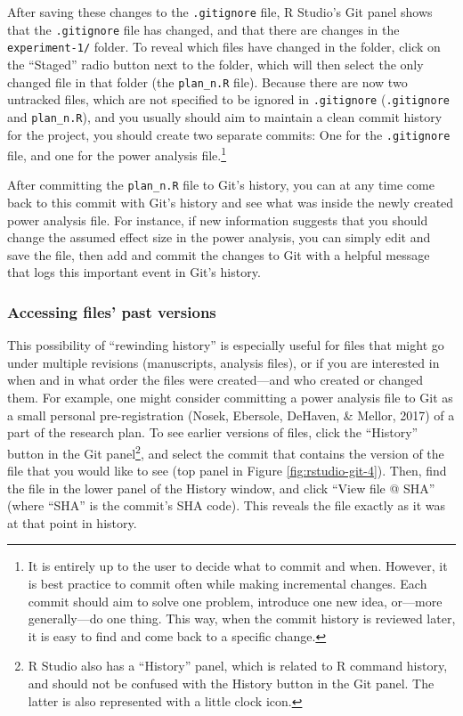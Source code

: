 \documentclass[
  american,
  ,doc,floatsintext]{apa6}
\begin{document}
After saving these changes to the \texttt{.gitignore} file, R Studio's Git panel shows that the \texttt{.gitignore} file has changed, and that there are changes in the \texttt{experiment-1/} folder. To reveal which files have changed in the folder, click on the ``Staged'' radio button next to the folder, which will then select the only changed file in that folder (the \texttt{plan\_n.R} file). Because there are now two untracked files, which are not specified to be ignored in \texttt{.gitignore} (\texttt{.gitignore} and \texttt{plan\_n.R}), and you usually should aim to maintain a clean commit history for the project, you should create two separate commits: One for the \texttt{.gitignore} file, and one for the power analysis file.\footnote{It is entirely up to the user to decide what to commit and when. However, it is best practice to commit often while making incremental changes. Each commit should aim to solve one problem, introduce one new idea, or---more generally---do one thing. This way, when the commit history is reviewed later, it is easy to find and come back to a specific change.}

After committing the \texttt{plan\_n.R} file to Git's history, you can at any time come back to this commit with Git's history and see what was inside the newly created power analysis file. For instance, if new information suggests that you should change the assumed effect size in the power analysis, you can simply edit and save the file, then add and commit the changes to Git with a helpful message that logs this important event in Git's history.

\hypertarget{accessing-files-past-versions}{%
\subsubsection{Accessing files' past versions}\label{accessing-files-past-versions}}

This possibility of ``rewinding history'' is especially useful for files that might go under multiple revisions (manuscripts, analysis files), or if you are interested in when and in what order the files were created---and who created or changed them. For example, one might consider committing a power analysis file to Git as a small personal pre-registration (Nosek, Ebersole, DeHaven, \& Mellor, 2017) of a part of the research plan. To see earlier versions of files, click the ``History'' button in the Git panel\footnote{R Studio also has a ``History'' panel, which is related to R command history, and should not be confused with the History button in the Git panel. The latter is also represented with a little clock icon.}, and select the commit that contains the version of the file that you would like to see (top panel in Figure \ref{fig:rstudio-git-4}). Then, find the file in the lower panel of the History window, and click ``View file @ SHA'' (where ``SHA'' is the commit's SHA code). This reveals the file exactly as it was at that point in history.
\end{document}

